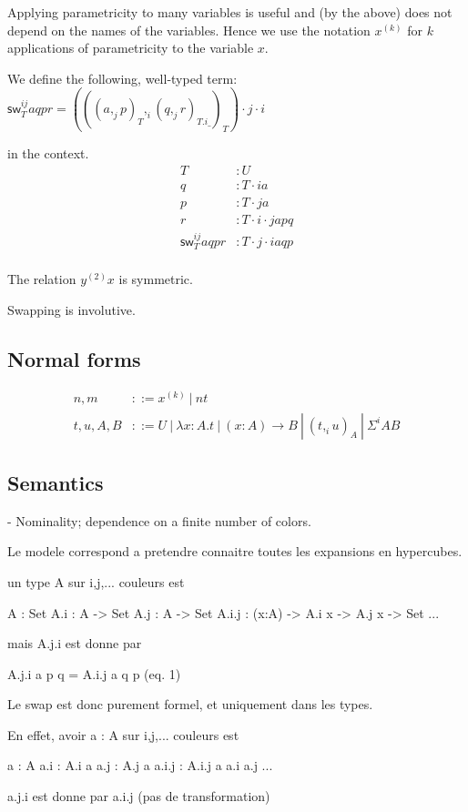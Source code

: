 \documentclass[10pt,a4paper]{article}
\newcommand\CC[4]{(#2,_{#1} #3)_{#4}}
\newcommand\CSig[1]{\Sigma^{#1}}
\newcommand\sw[2]{\mathsf{sw}^{#1}_{#2}}
\newcommand\param[1]{\!\cdot\!#1}
\newcommand\pvar[2]{{#1}^{(#2)}}
\begin{document}
Applying parametricity to many variables is useful and (by the above)
does not depend on the names of the variables. Hence we use the
notation $\pvar x k$ for $k$ applications of parametricity to the
variable $x$.

\begin{definition}
We define the following, well-typed term:
  $\sw {ij} T a q p r = (\CC i {\CC j a p T} {\CC j q r {T.i \_}} T) \param j \param i$

in the context.
\begin{align*}
  T &: U \\
  q &: T \param i a \\
  p &: T \param j a \\
  r &: T \param i \param j a p q \\
  \sw {ij} T a q p r & : T \param j \param i a q p \\
\end{align*}
\end{definition}

\begin{corollary}
  The relation $\pvar y 2 x$ is symmetric.
\end{corollary}

\begin{conjecture}
  Swapping is involutive.
\end{conjecture}

\subsection{Normal forms}

\begin{align*}
  n,m & ::= \pvar x k ~|~ n t \\
  t,u,A,B & ::= U ~|~ λx:A. t   ~|~  (x:A) → B
             ~|~ \CC i t u A ~|~ \CSig i A B
\end{align*}


\subsection{Semantics}

- Nominality; dependence on a finite number of colors.

Le modele correspond a pretendre connaitre toutes les expansions en hypercubes.

un type A sur i,j,... couleurs est

A : Set
A.i : A -> Set
A.j : A -> Set
A.i.j : (x:A) -> A.i x -> A.j x -> Set
...

mais A.j.i est donne par

A.j.i a p q = A.i.j a q p     (eq. 1)

Le swap est donc purement formel, et uniquement dans les types.

En effet, avoir a : A sur i,j,... couleurs est

a : A
a.i : A.i a
a.j : A.j a
a.i.j : A.i.j a a.i a.j
...

a.j.i est donne par a.i.j (pas de transformation)
\end{document}
